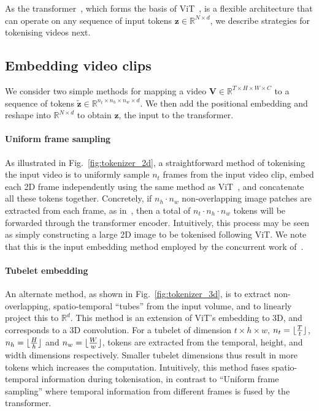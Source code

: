 As the transformer~\cite{vaswani_neurips_2017}, which forms the basis of ViT~\cite{dosovitskiy_iclr_2021}, is a flexible architecture that can operate on any sequence of input tokens $\mathbf{z} \in \mathbb{R}^{N \times d}$, we describe strategies for tokenising videos next.

\subsection{Embedding video clips}
\label{sec:method_input_encoding}
We consider two simple %
methods for mapping a video $\mathbf{V} \in \mathbb{R}^{T \times H \times W \times C}$ to a sequence of tokens $\mathbf{\tilde{z}} \in \mathbb{R}^{n_t \times n_h \times n_w \times d}$.
We then add the positional embedding and reshape into $\mathbb{R}^{N \times d}$ to obtain $\mathbf{z}$, the input to the transformer.%



\paragraph{Uniform frame sampling} 

As illustrated in Fig.~\ref{fig:tokenizer_2d}, a straightforward method of tokenising the input video is to uniformly sample $n_t$ frames from the input video clip, embed each 2D frame independently using the same method as ViT~\cite{dosovitskiy_iclr_2021}, and concatenate all these tokens together.
Concretely, if $n_h \cdot n_w$ non-overlapping image patches are extracted from each frame, as in~\cite{dosovitskiy_iclr_2021}, then a total of $n_t \cdot n_h \cdot n_w$ tokens will be forwarded through the transformer encoder. 
Intuitively, this process may be seen as simply constructing a large 2D image to be tokenised following ViT.
We note that this is the input embedding method employed by the concurrent work of~\cite{bertasius_arxiv_2021}.


\paragraph{Tubelet embedding}


An alternate method, as shown in Fig.~\ref{fig:tokenizer_3d}, is to extract non-overlapping, spatio-temporal ``tubes'' from the input volume, and to linearly project this to $\mathbb{R}^d$.
This method is an extension of ViT's embedding to 3D, and corresponds to a 3D convolution.
For a tubelet of dimension $t \times h \times w$, $n_t = \lfloor\frac{T}{t}\rfloor$, $n_h = \lfloor\frac{H}{h}\rfloor$ and $n_w = \lfloor\frac{W}{w}\rfloor$, tokens are extracted from the temporal, height, and width dimensions respectively.
Smaller tubelet dimensions thus result in more tokens which increases the computation. Intuitively, this method fuses spatio-temporal information during tokenisation, in contrast to ``Uniform frame sampling'' where temporal information from different frames is fused by the transformer.


